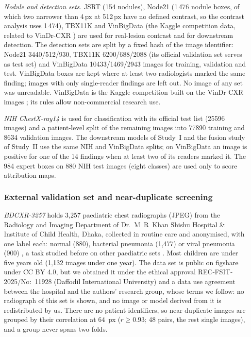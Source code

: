 \emph{Nodule and detection sets.} JSRT \cite{shiraishi2000jsrt} (154 nodules), Node21 \cite{sogancioglu2024node21} (1\,476 nodule boxes, of
which two narrower than 4\,px at 512\,px have no defined contrast, so the contrast analysis uses 1\,474), TBX11K \cite{liu2020tbx11k} and
VinBigData (the Kaggle competition data, related to VinDr-CXR \cite{nguyen2022vindrcxr}) are used for real-lesion contrast and for
downstream detection. The detection sets are split by a fixed hash of the image identifier: Node21 \num{3440}/\num{512}/\num{930}, TBX11K
\num{6200}/\num{688}/\num{2088} (its official validation set serves as test set) and VinBigData \num{10433}/\num{1469}/\num{2943} images
for training, validation and test. VinBigData boxes are kept where at least two radiologists marked the same finding; images with only
single-reader findings are left out. No image of any set was unreadable. VinBigData is the Kaggle competition built on the VinDr-CXR images
\cite{vinbigdata2020kaggle}; its rules allow non-commercial research use.

\emph{NIH ChestX-ray14} \cite{wang2017chestxray} is used for classification with its official test list (\num{25596} images) and a
patient-level split of the remaining images into \num{77890} training and \num{8634} validation images. The downstream models of Study~I
and the fusion study of Study~II use the same NIH and VinBigData splits; on VinBigData an image is positive for one of the 14 findings when
at least two of its readers marked it. The 984 expert boxes on 880 NIH test images (eight classes) are used only to score attribution maps.

\subsubsection{External validation set and near-duplicate screening}
\emph{BDCXR-3257} holds 3,257 paediatric chest radiographs (JPEG) from the Radiology and Imaging Department of Dr.~M~R~Khan Shishu Hospital
\& Institute of Child Health, Dhaka, collected in routine care and anonymised, with one label each: normal (880), bacterial pneumonia
(1,477) or viral pneumonia (900) \cite{durjoy2026bdcxr}, a task studied before on other paediatric sets \cite{kermany2018identifying}. Most
children are under five years old (1,132 images under one year). The data set is public on figshare under CC BY 4.0, but we obtained it
under the ethical approval REC-FSIT-2025/No:~11928 (Daffodil International University) and a data use agreement between the hospital and
the authors' research group, whose terms we follow: no radiograph of this set is shown, and no image or model derived from it is
redistributed by us. There are no patient identifiers, so near-duplicate images are grouped by their correlation at $64$~px
($r\ge0.93$; 48 pairs, the rest single images), and a group never spans two folds.

